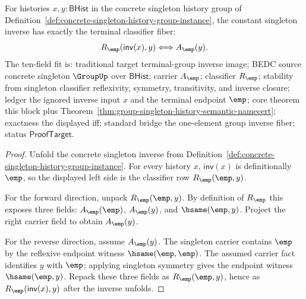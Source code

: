 \begin{theorem}
\label{thm:group-singleton-inverse-classifier-fiber}
For histories $x,y:\mathsf{BHist}$ in the concrete singleton history group of
Definition~\ref{def:concrete-singleton-history-group-instance}, the constant
singleton inverse has exactly the terminal classifier fiber:
$$
R_{\emp}(\mathsf{inv}(x),y)\Longleftrightarrow A_{\emp}(y).
$$
The ten-field fit is: traditional target terminal-group inverse image; BEDC
source concrete singleton $\GroupUp$ over $\mathsf{BHist}$; carrier $A_{\emp}$;
classifier $R_{\emp}$; stability from singleton classifier reflexivity,
symmetry, transitivity, and inverse closure; ledger the ignored inverse input
$x$ and the terminal endpoint $\emp$; core theorem this block plus
Theorem~\ref{thm:group-singleton-history-semantic-namecert}; exactness the
displayed iff; standard bridge the one-element group inverse fiber; status
$\mathsf{ProofTarget}$.
\end{theorem}
\begin{proof}
Unfold the concrete singleton inverse from
Definition~\ref{def:concrete-singleton-history-group-instance}. For every
history $x$, $\mathsf{inv}(x)$ is definitionally $\emp$, so the displayed left
side is the classifier row $R_{\emp}(\emp,y)$.

For the forward direction, unpack $R_{\emp}(\emp,y)$. By definition of
$R_{\emp}$ this exposes three fields: $A_{\emp}(\emp)$, $A_{\emp}(y)$, and
$\hsame(\emp,y)$. Project the right carrier field to obtain $A_{\emp}(y)$.

For the reverse direction, assume $A_{\emp}(y)$. The singleton carrier contains
$\emp$ by the reflexive endpoint witness $\hsame(\emp,\emp)$. The assumed carrier
fact identifies $y$ with $\emp$; applying singleton symmetry gives the endpoint
witness $\hsame(\emp,y)$. Repack these three fields as $R_{\emp}(\emp,y)$, hence
as $R_{\emp}(\mathsf{inv}(x),y)$ after the inverse unfolds.
\end{proof}
